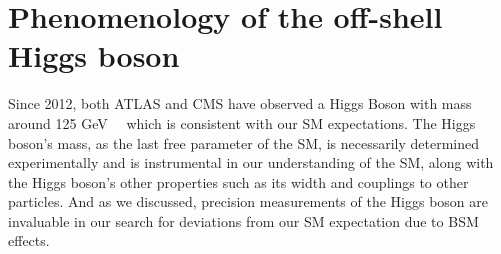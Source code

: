 









\section{Phenomenology of the off-shell Higgs boson}






Since 2012, both ATLAS and CMS have observed a Higgs Boson with mass around 125 GeV~\cite{20121}~\cite{201230} which is consistent with our SM expectations. The Higgs boson's mass, as the last free parameter of the SM, is necessarily determined experimentally and is instrumental in our understanding of the SM, along with the Higgs boson's other properties such as its width and couplings to other particles. And as we discussed, precision measurements of the Higgs boson are invaluable in our search for deviations from our SM expectation due to BSM effects.

